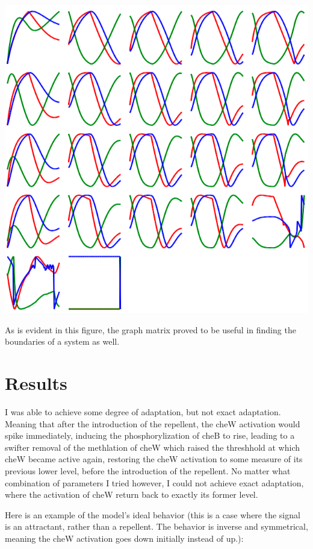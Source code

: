 \documentclass[12pt]{article}
\begin{document}
\includegraphics[scale=0.55]{matrix.png}

As is evident in this figure, the graph matrix proved to be useful in finding the boundaries of a system as well.

\section{Results}

I was able to achieve some degree of adaptation, but not exact adaptation.  Meaning that after the introduction of the repellent, the cheW activation would spike immediately, inducing the phosphorylization of cheB to rise, leading to a swifter removal of the methlation of cheW which raised the threshhold at which cheW became active again, restoring the cheW activation to some measure of its previous lower level, before the introduction of the repellent.  No matter what combination of parameters I tried however, I could not achieve exact adaptation, where the activation of cheW return back to exactly its former level.  

Here is an example of the model's ideal behavior (this is a case where the signal is an attractant, rather than a repellent.  The behavior is inverse and symmetrical, meaning the cheW activation goes down initially instead of up.):
\end{document}
